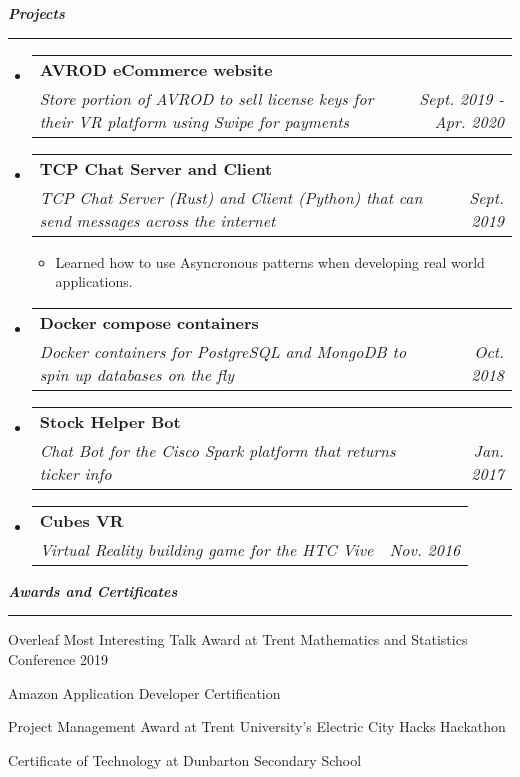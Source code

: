 \documentclass[letterpaper,11pt]{article}
\makeatletter
\newcommand{\resitem}[1]{\item #1 \vspace{-2pt}}
\newcommand{\mysection}[1]{\vspace{5pt} {\bfseries \textsl{#1}} \\ {\color{gray} \rule[5pt]{\textwidth}{1pt}}}
\newcommand{\ressubheading}[4]{\begin{tabular*}{6.5in}{l@{\extracolsep{\fill}}r}
        \textbf{#1} & #2 \\
        \textit{#3} & \textit{#4} \\
\end{tabular*}\vspace{-6pt}}
\makeatother
\begin{document}
\mysection{Projects}
\begin{itemize}
    \item
        \ressubheading{AVROD eCommerce website}{}{Store portion of AVROD to sell license keys for their VR platform using Swipe for payments}{Sept. 2019 - Apr. 2020}
    \item
        \ressubheading{TCP Chat Server and Client}{}{TCP Chat Server (Rust) and
        Client (Python) that can send messages across the internet}{Sept. 2019}
        \begin{itemize}
                \resitem{Learned how to use Asyncronous patterns when developing
                real world applications.}
        \end{itemize}
    \item
        \ressubheading{Docker compose containers}{}{Docker containers for PostgreSQL and MongoDB to spin up databases on the fly}{Oct. 2018}
    \item
        \ressubheading{Stock Helper Bot}{}{Chat Bot for the Cisco Spark platform that returns ticker info}{Jan. 2017}
    \item
        \ressubheading{Cubes VR}{}{Virtual Reality building game for the HTC Vive}{Nov. 2016}

\end{itemize}

\mysection{Awards and Certificates}
\begin{description}
    \item Overleaf Most Interesting Talk Award at Trent Mathematics and Statistics Conference 2019
    \item Amazon Application Developer Certification
    \item Project Management Award at Trent University's Electric City Hacks Hackathon
    \item Certificate of Technology at Dunbarton Secondary School
\end{description}
\end{document}

